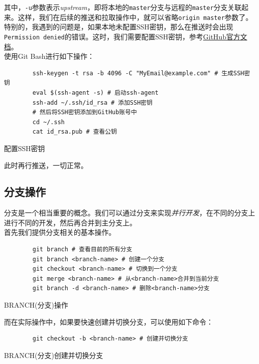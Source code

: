 其中，\texttt{-u}参数表示\textit{upstream}，即将本地的\texttt{master}分支与远程的\texttt{master}分支关联起来。这样，我们在后续的推送和拉取操作中，就可以省略\texttt{origin master}参数了。\\

特别的，我遇到的问题是，如果本地未配置SSH密钥，那么在推送时会出现\texttt{Permission denied}的错误。这时，我们需要配置SSH密钥，参考\href{https://docs.github.com/en/github/authenticating-to-github/connecting-to-github-with-ssh}{GitHub官方文档}。\\

使用Git Bash进行如下操作：

\begin{listing}[!h]
    \begin{verbatim}
        ssh-keygen -t rsa -b 4096 -C "MyEmail@example.com" # 生成SSH密钥
        eval $(ssh-agent -s) # 启动ssh-agent
        ssh-add ~/.ssh/id_rsa # 添加SSH密钥
        # 然后将SSH密钥添加到GitHub账号中
        cd ~/.ssh
        cat id_rsa.pub # 查看公钥
    \end{verbatim}
    \caption{配置SSH密钥}
\end{listing}

此时再行推送，一切正常。

\subsection{分支操作}

分支是一个相当重要的概念。我们可以通过分支来实现\textit{并行开发}，在不同的分支上进行不同的开发，然后再合并到主分支上。\\

首先我们提供分支相关的基本操作。

\begin{listing}[!htpb]
    \begin{verbatim}
        git branch # 查看目前的所有分支
        git branch <branch-name> # 创建一个分支
        git checkout <branch-name> # 切换到一个分支
        git merge <branch-name> # 从<branch-name>合并到当前分支
        git branch -d <branch-name> # 删除<branch-name>分支
    \end{verbatim}
    \caption{BRANCH(分支)操作}
\end{listing}

而在实际操作中，如果要快速创建并切换分支，可以使用如下命令：

\begin{listing}[!htpb]
    \begin{verbatim}
        git checkout -b <branch-name> # 创建并切换分支
    \end{verbatim}
    \caption{BRANCH(分支)创建并切换分支}
\end{listing}


